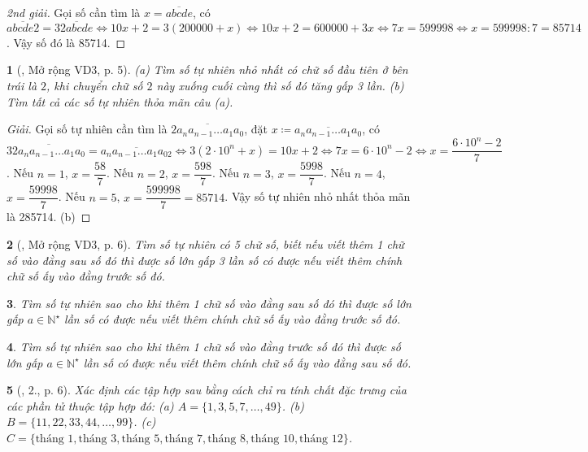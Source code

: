 \documentclass{article}
\newtheorem{baitoan}{}
\begin{document}
\begin{proof}[2nd giải]
	Gọi số cần tìm là $x = \overline{abcde}$, có $\overline{abcde2} = 3\overline{2abcde}\Leftrightarrow10x + 2 = 3(200000 + x)\Leftrightarrow10x + 2 = 600000 + 3x\Leftrightarrow7x = 599998\Leftrightarrow x = 599998:7 = 85714$. Vậy số đó là 85714.
\end{proof}

\begin{baitoan}[\cite{Binh_Toan_6_tap_1}, Mở rộng VD3, p. 5]
	(a) Tìm số tự nhiên nhỏ nhất có chữ số đầu tiên ở bên trái là $2$, khi chuyển chữ số $2$ này xuống cuối cùng thì số đó tăng gấp 3 lần. (b) Tìm tất cả các số tự nhiên thỏa mãn câu (a).
\end{baitoan}

\begin{proof}[Giải]
	Gọi số tự nhiên cần tìm là $\overline{2a_na_{n-1}\ldots a_1a_0}$, đặt $x\coloneqq\overline{a_na_{n-1}\ldots a_1a_0}$, có $3\overline{2a_na_{n-1}\ldots a_1a_0} = \overline{a_na_{n-1}\ldots a_1a_02}\Leftrightarrow3(2\cdot10^n + x) = 10x + 2\Leftrightarrow7x = 6\cdot10^n - 2\Leftrightarrow x = \dfrac{6\cdot10^n - 2}{7}$. Nếu $n = 1$, $x = \dfrac{58}{7}$. Nếu $n = 2$, $x = \dfrac{598}{7}$. Nếu $n = 3$, $x = \dfrac{5998}{7}$. Nếu $n = 4$, $x = \dfrac{59998}{7}$. Nếu $n = 5$, $x = \dfrac{599998}{7} = 85714$. Vậy số tự nhiên nhỏ nhất thỏa mãn là 285714. (b) 
\end{proof}

\begin{baitoan}[\cite{Binh_Toan_6_tap_1}, Mở rộng VD3, p. 6]
	Tìm số tự nhiên có 5 chữ số, biết nếu viết thêm 1 chữ số vào đằng sau số đó thì được số lớn gấp 3 lần số có được nếu viết thêm chính chữ số ấy vào đằng trước số đó.
\end{baitoan}

\begin{baitoan}
	Tìm số tự nhiên sao cho khi thêm 1 chữ số vào đằng sau số đó thì được số lớn gấp $a\in\mathbb{N}^\star$ lần số có được nếu viết thêm chính chữ số ấy vào đằng trước số đó.
\end{baitoan}

\begin{baitoan}
	Tìm số tự nhiên sao cho khi thêm 1 chữ số vào đằng trước số đó thì được số lớn gấp $a\in\mathbb{N}^\star$ lần số có được nếu viết thêm chính chữ số ấy vào đằng sau số đó.
\end{baitoan}

\begin{baitoan}[\cite{Binh_Toan_6_tap_1}, 2., p. 6]
	Xác định các tập hợp sau bằng cách chỉ ra tính chất đặc trưng của các phần tử thuộc tập hợp đó: (a) $A = \{1,3,5,7,\ldots,49\}$. (b) $B = \{11,22,33,44,\ldots,99\}$. (c) $C = \{\mbox{tháng } 1,\mbox{tháng } 3,\mbox{tháng } 5,\mbox{tháng } 7,\mbox{tháng } 8,\mbox{tháng } 10,\mbox{tháng } 12\}$.
\end{baitoan}
\end{document}
